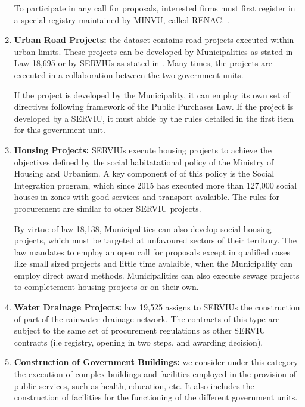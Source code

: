 \begin{enumerate}[wide, labelwidth=!,labelindent=0pt,label=\textbf{\arabic*}.]
To participate in any call for proposals, interested firms must first register in a special registry maintained by MINVU, called RENAC. .

\item \textbf{Urban Road Projects:} the dataset contains road projects executed within urban limits. These projects can be developed by Municipalities as stated in Law 18,695 or by SERVIUs as stated in . Many times, the projects are executed in a collaboration between the two government units.

If the project is developed by the Municipality, it can employ its own set of directives following framework of the Public Purchases Law. If the project is developed by a SERVIU, it must abide by the rules detailed in the first item for this government unit.

\item \textbf{Housing Projects:} SERVIUs execute housing projects to achieve the objectives defined by the social habitatational policy of the Ministry of Housing and Urbanism. A key component of of this policy is the Social Integration program, which since 2015 has executed more than 127,000 social houses in zones with good services and transport avalaible. The rules for procurement are similar to other SERVIU projects.

By virtue of law 18,138, Municipalities can also develop social housing projects, which must be targeted at unfavoured sectors of their territory. The law mandates to employ an open call for proposals except in qualified cases like small sized projects and little time avalaible, when the Municipality can employ direct award methods. Municipalities can also execute sewage projects to completement housing projects or on their own.

\item \textbf{Water Drainage Projects:} law 19,525 assigns to SERVIUs the construction of part of the rainwater drainage network. The contracts of this type are subject to the same set of procurement regulations as other SERVIU contracts (i.e registry, opening in two steps, and awarding decision).

\item \textbf{Construction of Government Buildings:} we consider under this category the execution of complex buildings and facilities employed in the provision of public services, such as health, education, etc. It also includes the construction of facilities for the functioning of the different government units.


\end{enumerate}
